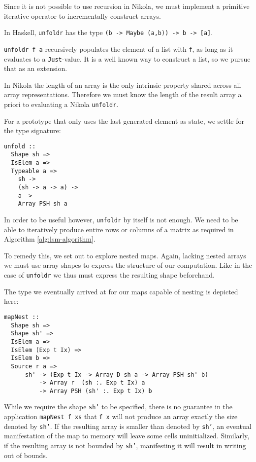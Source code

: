 Since it is not possible to use recursion in Nikola, we must implement a
primitive iterative operator to incrementally construct arrays.

In Haskell, \texttt{unfoldr} has the type \texttt{(b -> Maybe (a,b)) -> b ->
[a]}.

\texttt{unfoldr f a} recursively populates the element of a list with
\texttt{f}, as long as it evaluates to a \texttt{Just}-value. It is a well known
way to construct a list, so we pursue that as an extension.

In Nikola the length of an array is the only intrinsic property shared across
all array representations. Therefore we must know the length of the result array a
priori to evaluating a Nikola \texttt{unfoldr}.

For a prototype that only uses the last generated element as state, we settle
for the type signature:
\begin{verbatim}
unfold ::
  Shape sh =>
  IsElem a =>
  Typeable a =>
    sh ->
    (sh -> a -> a) ->
    a ->
    Array PSH sh a
\end{verbatim}

In order to be useful however, \texttt{unfoldr} by itself is not enough.  We
need to be able to iteratively produce entire rows or columns of a matrix as
required in Algorithm \ref{alg:lsm-algorithm}.

To remedy this, we set out to explore nested maps. Again, lacking nested arrays
we must use array shapes to express the structure of our computation.  Like in
the case of \texttt{unfoldr} we thus must express the resulting shape beforehand.

The type we eventually arrived at for our maps capable of nesting is depicted
here:
\begin{verbatim}
mapNest ::
  Shape sh =>
  Shape sh' =>
  IsElem a =>
  IsElem (Exp t Ix) =>
  IsElem b =>
  Source r a =>
      sh' -> (Exp t Ix -> Array D sh a -> Array PSH sh' b)
          -> Array r  (sh :. Exp t Ix) a
          -> Array PSH (sh' :. Exp t Ix) b
\end{verbatim}

While we require the shape \texttt{sh'} to be specified, there is no guarantee
in the application \texttt{mapNest f xs} that \texttt{f x} will not produce an
array exactly the size denoted by \texttt{sh'}. If the resulting array is
smaller than denoted by \texttt{sh'}, an eventual manifestation of the map to
memory will leave some cells uninitialized. Similarly, if the resulting array
is not bounded by \texttt{sh'}, manifesting it will result in writing out of
bounds.

